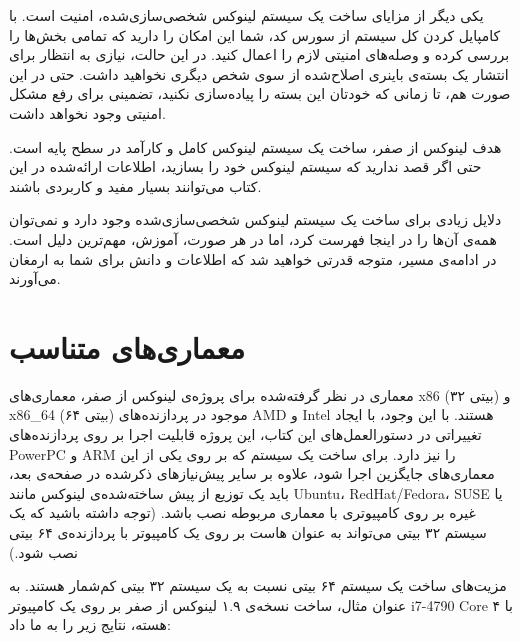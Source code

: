 \documentclass{book}
\begin{document}
\par
یکی دیگر از مزایای ساخت یک سیستم لینوکس شخصی‌سازی‌شده، امنیت است. با کامپایل کردن کل سیستم از سورس کد، شما این امکان را دارید که تمامی بخش‌ها را بررسی کرده و وصله‌های امنیتی لازم را اعمال کنید. در این حالت، نیازی به انتظار برای انتشار یک بسته‌ی باینری اصلاح‌شده از سوی شخص دیگری نخواهید داشت. حتی در این صورت هم، تا زمانی که خودتان این بسته را پیاده‌سازی نکنید، تضمینی برای رفع مشکل امنیتی وجود نخواهد داشت.
\newline

\par
هدف لینوکس از صفر، ساخت یک سیستم لینوکس کامل و کارآمد در سطح پایه است. حتی اگر قصد ندارید که سیستم لینوکس خود را بسازید، اطلاعات ارائه‌شده در این کتاب می‌توانند بسیار مفید و کاربردی باشند.
\newline

\par
دلایل زیادی برای ساخت یک سیستم لینوکس شخصی‌سازی‌شده وجود دارد و نمی‌توان همه‌ی آن‌ها را در اینجا فهرست کرد، اما در هر صورت، آموزش، مهم‌ترین دلیل است. در ادامه‌ی مسیر، متوجه قدرتی خواهید شد که اطلاعات و دانش برای شما به ارمغان می‌آورند.



\newpage

\section{معماری‌های متناسب}

معماری در نظر گرفته‌شده برای پروژه‌ی لینوکس از صفر، معماری‌های x86 (۳۲ بیتی) و x86\_64 (۶۴ بیتی) موجود در پردازنده‌های AMD و Intel هستند. با این وجود، با ایجاد تغییراتی در دستورالعمل‌های این کتاب، این پروژه قابلیت اجرا بر روی پردازنده‌های PowerPC و ARM را نیز دارد. برای ساخت یک سیستم که بر روی یکی از این معماری‌های جایگزین اجرا شود، علاوه بر سایر پیش‌نیازهای ذکرشده در صفحه‌ی بعد، باید یک توزیع از پیش ساخته‌شده‌ی لینوکس مانند Ubuntu، RedHat/Fedora، SUSE یا غیره بر روی کامپیوتری با معماری مربوطه نصب باشد. (توجه داشته باشید که یک سیستم ۳۲ بیتی می‌تواند به عنوان هاست بر روی یک کامپیوتر با پردازنده‌ی ۶۴ بیتی نصب شود.)
\newline

\par
مزیت‌های ساخت یک سیستم ۶۴ بیتی نسبت به یک سیستم ۳۲ بیتی کم‌شمار هستند. به عنوان مثال، ساخت نسخه‌ی ۱.۹ لینوکس از صفر بر روی یک کامپیوتر i7-4790 Core با ۴ هسته، نتایج زیر را به ما داد:
\newline
\newline
\end{document}
